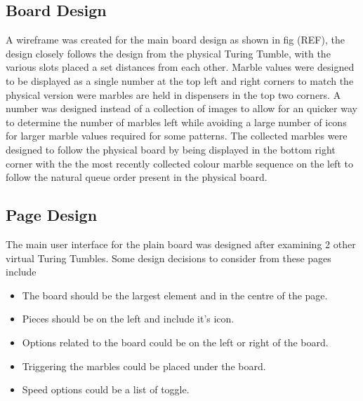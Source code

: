 \documentclass{l4proj}
\begin{document}
\subsection{Board Design}
A wireframe was created for the main board design as shown in fig (REF), the design closely follows the design from the physical Turing Tumble, with the various slots placed a set distances from each other. Marble values were designed to be displayed as a single number at the top left and right corners to match the physical version were marbles are held in dispensers in the top two corners. A number was designed instead of a collection of images to allow for an quicker way to determine the number of marbles left while avoiding a large number of icons for larger marble values required for some patterns. The collected marbles were designed to follow the physical board by being displayed in the bottom right corner with the the most recently collected colour marble sequence on the left to follow the natural queue order present in the physical board.

\subsection{Page Design}
The main user interface for the plain board was designed after examining 2 other virtual Turing Tumbles. Some design decisions to consider from these pages include
\begin{itemize}
    \item The board should be the largest element and in the centre of the page.
    \item Pieces should be on the left and include it's icon.
    \item Options related to the board could be on the left or right of the board.
    \item Triggering the marbles could be placed under the board.
    \item Speed options could be a list of toggle.
\end{itemize}
\end{document}
